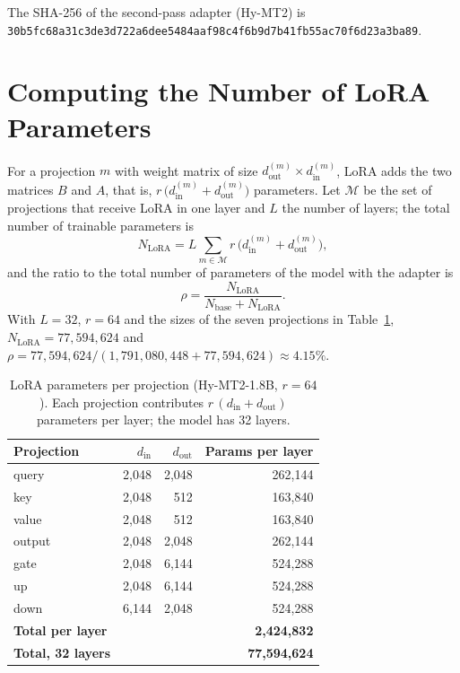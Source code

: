 \documentclass[conference]{IEEEtran}
\begin{document}
The SHA-256 of the second-pass adapter (Hy-MT2) is {\footnotesize\texttt{30b5fc68a31c3de3d722\allowbreak a6dee5484aaf98c4f6b9d7\allowbreak b41fb55ac70f6d23a3ba89}}.

\section{Computing the Number of LoRA Parameters}\label{app:lora}
For a projection $m$ with weight matrix of size $d_{\mathrm{out}}^{(m)} \times d_{\mathrm{in}}^{(m)}$, LoRA adds the two matrices $B$ and $A$, that is, $r\,\big(d_{\mathrm{in}}^{(m)} + d_{\mathrm{out}}^{(m)}\big)$ parameters. Let $\mathcal{M}$ be the set of projections that receive LoRA in one layer and $L$ the number of layers; the total number of trainable parameters is
\begin{equation}
N_{\mathrm{LoRA}} = L \sum_{m \in \mathcal{M}} r\,\big(d_{\mathrm{in}}^{(m)} + d_{\mathrm{out}}^{(m)}\big),
\end{equation}
and the ratio to the total number of parameters of the model with the adapter is
\begin{equation}
\rho = \frac{N_{\mathrm{LoRA}}}{N_{\mathrm{base}} + N_{\mathrm{LoRA}}}.
\end{equation}
With $L=32$, $r=64$ and the sizes of the seven projections in Table~\ref{tab:loraparams}, $N_{\mathrm{LoRA}} = 77{,}594{,}624$ and $\rho = 77{,}594{,}624 / (1{,}791{,}080{,}448 + 77{,}594{,}624) \approx 4.15\%$.

\begin{table}[t]
\caption{LoRA parameters per projection (Hy-MT2-1.8B, $r=64$). Each projection contributes $r\,(d_{\mathrm{in}}+d_{\mathrm{out}})$ parameters per layer; the model has 32 layers.}
\label{tab:loraparams}
\centering
\footnotesize
\begin{tabular}{lrrr}
\toprule
Projection & $d_{\mathrm{in}}$ & $d_{\mathrm{out}}$ & Params per layer \\
\midrule
query & 2,048 & 2,048 & 262,144 \\
key & 2,048 & 512 & 163,840 \\
value & 2,048 & 512 & 163,840 \\
output & 2,048 & 2,048 & 262,144 \\
gate & 2,048 & 6,144 & 524,288 \\
up & 2,048 & 6,144 & 524,288 \\
down & 6,144 & 2,048 & 524,288 \\
\midrule
\textbf{Total per layer} & & & \textbf{2,424,832} \\
\textbf{Total, 32 layers} & & & \textbf{77,594,624} \\
\bottomrule
\end{tabular}
\end{table}
\end{document}
